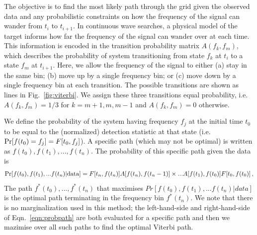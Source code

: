 \documentclass[paper-main.tex]{subfiles}
\begin{document}


The objective is to find the most likely path through the grid given the observed data and any probabilistic constraints on how the frequency of the signal can wander from $t_i$ to $t_{i+1}$. 
In continuous wave searches, a physical model of the target informs how far the frequency of the signal can wander over at each time. 
This information is encoded in the transition probability matrix $A(f_k,f_m)$, which describes the probability of system transitioning from state $f_k$ at $t_i$ to a state $f_{m}$ at $t_{i+1}$. 
Here, we allow the frequency of the signal to either (a) stay in the same bin; (b) move up by a single frequency bin; or (c) move down by a single frequency bin at each transition. 
The possible transitions are shown as lines in Fig.~\ref{fig:viterbi}.
We assign these three transitions equal probability, i.e.\ $A(f_k,f_m)=1/3$ for $k=m+1,m,m-1$ and $A(f_k,f_m)=0$ otherwise.



We define the probability of the system having frequency $f_j$ at the initial time $t_0$ to be equal to the (normalized) detection statistic at that state (i.e.\  ${\rm Pr}[f(t_0) = f_j] = F[t_0,f_j]$).
A specific path (which may not be optimal) is written as $f(t_0), f(t_1),..., f(t_n)$. 
The probability of this specific path given the data is 
\begin{eqnarray}
{\rm Pr}[ f(t_0), f(t_1),... f(t_n) | {\rm data}] =
          F[t_n,f(t_n)] A[f(t_n),f(t_n-1)]
          \times... A[f(t_1),f(t_0)] F[t_0,f(t_0)]\,,
\label{eqn:pathprob}
\end{eqnarray}
The path $f^\ast(t_0),...,f^\ast(t_n)$ that maximises $Pr[ f(t_0), f(t_1),... f(t_n) | data]$ is the optimal path terminating in the frequency bin $f^\ast(t_n)$. 
We note that there is no marginalization used in this method; the left-hand-side and right-hand-side of Eqn.~\ref{eqn:probpath} are both evaluated for a specific path and then we mazimise over all such paths to find the optimal Viterbi path. 
\end{document}
